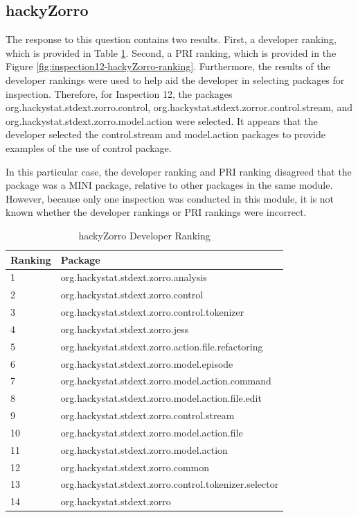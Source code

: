 \clearpage
\subsection{hackyZorro}
The response to this question contains two results. First, a developer
ranking, which is provided in Table
\ref{tab:hackyZorro-developer-ranking}. Second, a PRI ranking, which is
provided in the Figure \ref{fig:inspection12-hackyZorro-ranking}.
Furthermore, the results of the developer rankings were used to help aid
the developer in selecting packages for inspection. Therefore, for
Inspection 12, the packages org.hackystat.stdext.zorro.control,
org.hackystat.stdext.zorror.control.stream, and
org.hackystat.stdext.zorro.model.action were selected. It appears that the
developer selected the control.stream and model.action packages to provide
examples of the use of control package. 

In this particular case, the developer ranking and PRI ranking disagreed
that the package was a MINI package, relative to other packages in the same
module. However, because only one inspection was conducted in this module,
it is not known whether the developer rankings or PRI rankings were
incorrect.

\begin{table}[!h]
  \begin{center}
    \caption{hackyZorro Developer Ranking}
    \label{tab:hackyZorro-developer-ranking}
    \begin{tabular}{|p{1.5cm}|p{11.5cm}|} \hline
{\bf Ranking} & {\bf Package} \\ \hline
1 & org.hackystat.stdext.zorro.analysis \\ \hline
2 & org.hackystat.stdext.zorro.control \\ \hline
3 & org.hackystat.stdext.zorro.control.tokenizer \\ \hline
4 & org.hackystat.stdext.zorro.jess \\ \hline
5 & org.hackystat.stdext.zorro.action.file.refactoring \\ \hline
6 & org.hackystat.stdext.zorro.model.episode \\ \hline
7 & org.hackystat.stdext.zorro.model.action.command \\ \hline
8 & org.hackystat.stdext.zorro.model.action.file.edit \\ \hline
9 & org.hackystat.stdext.zorro.control.stream \\ \hline
10 & org.hackystat.stdext.zorro.model.action.file \\ \hline
11 & org.hackystat.stdext.zorro.model.action \\ \hline
12 & org.hackystat.stdext.zorro.common \\ \hline
13 & org.hackystat.stdext.zorro.control.tokenizer.selector \\ \hline
14 & org.hackystat.stdext.zorro \\ \hline
    \end{tabular}
  \end{center}
\end{table}

